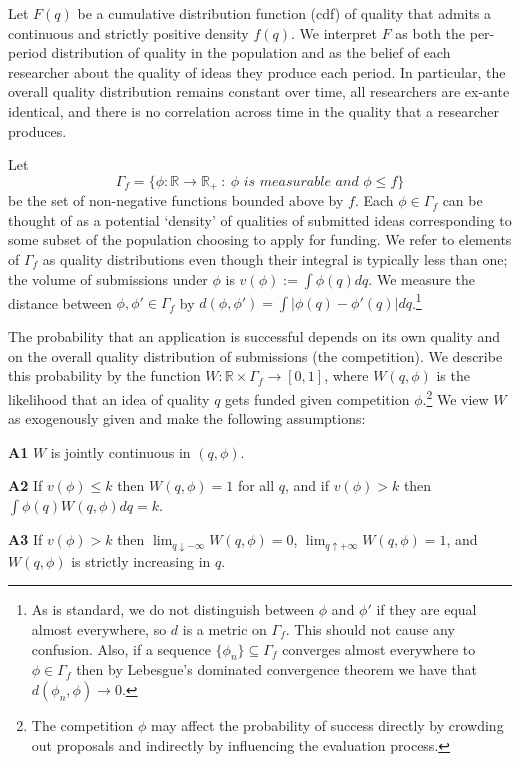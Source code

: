 \documentclass[12pt]{article}
\theoremstyle{plain}
\theoremstyle{definition}
\theoremstyle{remark}
\def\RR{\mathbb{R}}
\begin{document}
Let $F(q)$ be a cumulative distribution function (cdf) of quality that admits a continuous and strictly positive density $f(q)$. We interpret $F$ as both the per-period distribution of quality in the population and as the belief of each researcher about the quality of ideas they produce each period. In particular, the overall quality distribution remains constant over time, all researchers are ex-ante identical, and there is no correlation across time in the quality that a researcher produces.

Let 
$$\Gamma_f = \{\phi:\RR\to \RR_+ ~:~ \phi \textit{ is measurable and } \phi\le f \}$$
be the set of non-negative functions bounded above by $f$. Each $\phi\in \Gamma_f$ can be thought of as a potential `density' of qualities of submitted ideas corresponding to some subset of the population choosing to apply for funding. We refer to elements of $\Gamma_f$ as quality distributions even though their integral is typically less than one; the volume of submissions under $\phi$ is $v(\phi):=\int \phi(q)dq$. We measure the distance between $\phi,\phi' \in \Gamma_f$ by $d(\phi,\phi')=\int|\phi(q)-\phi'(q)|dq$.\footnote{As is standard, we do not distinguish between $\phi$ and $\phi'$ if they are equal almost everywhere, so $d$ is a metric on $\Gamma_f$. This should not cause any confusion. Also, if a sequence $\{\phi_n\}\subseteq \Gamma_f$ converges almost everywhere to $\phi\in\Gamma_f$ then by Lebesgue's dominated convergence theorem we have that $d(\phi_n,\phi)\to 0$.} 

The probability that an application is successful depends on its own quality and on the overall quality distribution of submissions (the competition). We describe this probability by the function $W:\RR\times \Gamma_f \to [0,1]$, where $W(q,\phi)$ is the likelihood that an idea of quality $q$ gets funded given competition $\phi$.\footnote{The competition $\phi$ may affect the probability of success directly by crowding out proposals and indirectly by influencing the evaluation process.} We view $W$ as exogenously given and make the following assumptions:

\textbf{A1} $W$ is jointly continuous in $(q,\phi)$.

\textbf{A2} If $v(\phi)\le k$ then $W(q,\phi)=1$ for all $q$, and if $v(\phi)>k$ then $\int \phi(q)W(q,\phi)dq = k$.

\textbf{A3} If $v(\phi)>k$ then $\lim_{q\downarrow -\infty} W(q,\phi)=0$, $\lim_{q\uparrow +\infty} W(q,\phi)=1$, and $W(q,\phi)$ is strictly increasing in $q$.
\end{document}
